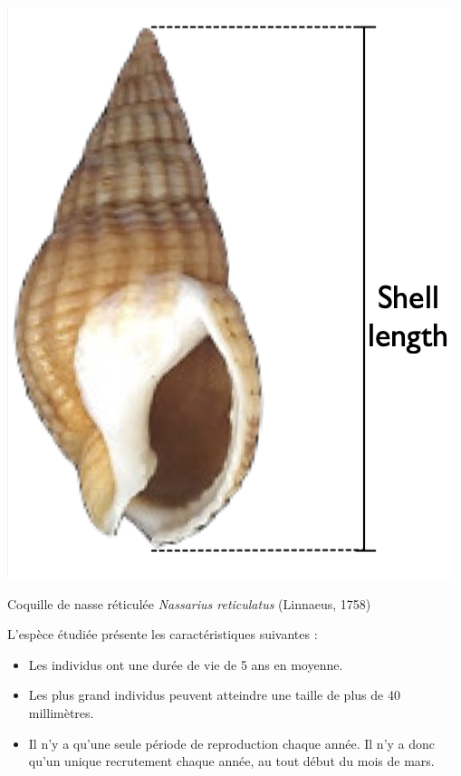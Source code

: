 \documentclass[
  a4paper,
  DIV=11,
  numbers=noendperiod,
  oneside]{scrreprt}
\providecommand{\tightlist}{%
  \setlength{\itemsep}{0pt}\setlength{\parskip}{0pt}}\usepackage{longtable,booktabs,array}
\begin{document}
\begin{marginfigure}

{\centering \includegraphics{./images/Nassarius.png}

}

\caption{\label{fig-nasse}Coquille de nasse réticulée \emph{Nassarius
reticulatus} (Linnaeus, 1758)}

\end{marginfigure}

L'espèce étudiée présente les caractéristiques suivantes :

\begin{itemize}
\tightlist
\item
  Les individus ont une durée de vie de 5 ans en moyenne.
\item
  Les plus grand individus peuvent atteindre une taille de plus de 40
  millimètres.
\item
  Il n'y a qu'une seule période de reproduction chaque année. Il n'y a
  donc qu'un unique recrutement chaque année, au tout début du mois de
  mars.
\end{itemize}
\end{document}
